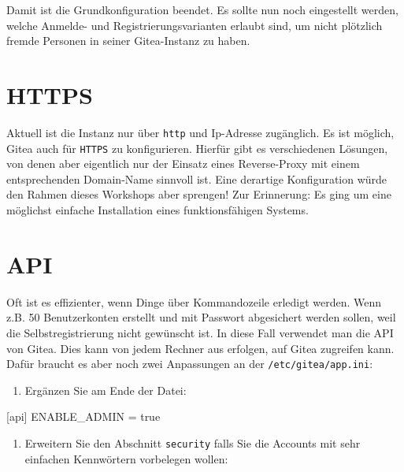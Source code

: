 \documentclass[
  letterpaper,
  DIV=11]{scrreprt}
\newenvironment{Shaded}{\begin{snugshade}}{\end{snugshade}}
\newcommand{\ExtensionTok}[1]{\textcolor[rgb]{0.00,0.23,0.31}{#1}}
\newcommand{\NormalTok}[1]{\textcolor[rgb]{0.00,0.23,0.31}{#1}}
\providecommand{\tightlist}{%
  \setlength{\itemsep}{0pt}\setlength{\parskip}{0pt}}\usepackage{longtable,booktabs,array}
\begin{document}
Damit ist die Grundkonfiguration beendet. Es sollte nun noch eingestellt
werden, welche Anmelde- und Registrierungsvarianten erlaubt sind, um
nicht plötzlich fremde Personen in seiner Gitea-Instanz zu haben.

\section{HTTPS}\label{https}

Aktuell ist die Instanz nur über \texttt{http} und Ip-Adresse
zugänglich. Es ist möglich, Gitea auch für \texttt{HTTPS} zu
konfigurieren. Hierfür gibt es verschiedenen Lösungen, von denen aber
eigentlich nur der Einsatz eines Reverse-Proxy mit einem entsprechenden
Domain-Name sinnvoll ist. Eine derartige Konfiguration würde den Rahmen
dieses Workshops aber sprengen! Zur Erinnerung: Es ging um eine
möglichst einfache Installation eines funktionsfähigen Systems.

\section{API}\label{api}

Oft ist es effizienter, wenn Dinge über Kommandozeile erledigt werden.
Wenn z.B. 50 Benutzerkonten erstellt und mit Passwort abgesichert werden
sollen, weil die Selbstregistrierung nicht gewünscht ist. In diese Fall
verwendet man die API von Gitea. Dies kann von jedem Rechner aus
erfolgen, auf Gitea zugreifen kann. Dafür braucht es aber noch zwei
Anpassungen an der \texttt{/etc/gitea/app.ini}:

\begin{enumerate}
\def\labelenumi{\arabic{enumi}.}
\tightlist
\item
  Ergänzen Sie am Ende der Datei:
\end{enumerate}

\begin{Shaded}
\begin{Highlighting}[]
\ExtensionTok{[api]}
\ExtensionTok{ENABLE\_ADMIN}\NormalTok{ = true}
\end{Highlighting}
\end{Shaded}

\begin{enumerate}
\def\labelenumi{\arabic{enumi}.}
\setcounter{enumi}{1}
\tightlist
\item
  Erweitern Sie den Abschnitt \texttt{security} falls Sie die Accounts
  mit sehr einfachen Kennwörtern vorbelegen wollen:
\end{enumerate}
\end{document}
